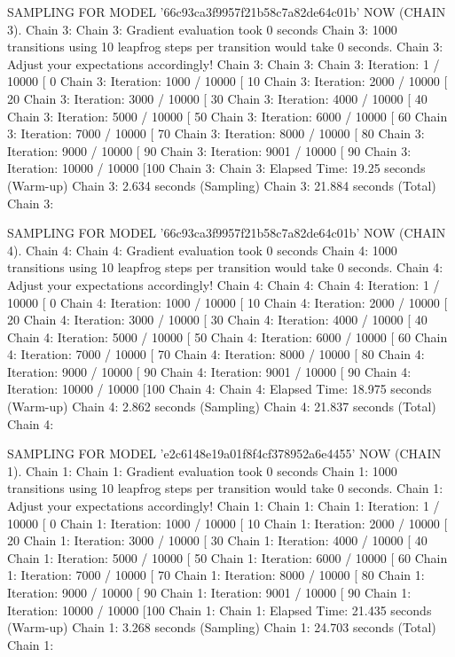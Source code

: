 \documentclass[
]{jss}
\begin{document}
\begin{CodeChunk}
\begin{CodeOutput}
SAMPLING FOR MODEL '66c93ca3f9957f21b58c7a82de64c01b' NOW (CHAIN 3).
Chain 3: 
Chain 3: Gradient evaluation took 0 seconds
Chain 3: 1000 transitions using 10 leapfrog steps per transition would take 0 seconds.
Chain 3: Adjust your expectations accordingly!
Chain 3: 
Chain 3: 
Chain 3: Iteration:    1 / 10000 [  0%
Chain 3: Iteration: 1000 / 10000 [ 10%
Chain 3: Iteration: 2000 / 10000 [ 20%
Chain 3: Iteration: 3000 / 10000 [ 30%
Chain 3: Iteration: 4000 / 10000 [ 40%
Chain 3: Iteration: 5000 / 10000 [ 50%
Chain 3: Iteration: 6000 / 10000 [ 60%
Chain 3: Iteration: 7000 / 10000 [ 70%
Chain 3: Iteration: 8000 / 10000 [ 80%
Chain 3: Iteration: 9000 / 10000 [ 90%
Chain 3: Iteration: 9001 / 10000 [ 90%
Chain 3: Iteration: 10000 / 10000 [100%
Chain 3: 
Chain 3:  Elapsed Time: 19.25 seconds (Warm-up)
Chain 3:                2.634 seconds (Sampling)
Chain 3:                21.884 seconds (Total)
Chain 3: 

SAMPLING FOR MODEL '66c93ca3f9957f21b58c7a82de64c01b' NOW (CHAIN 4).
Chain 4: 
Chain 4: Gradient evaluation took 0 seconds
Chain 4: 1000 transitions using 10 leapfrog steps per transition would take 0 seconds.
Chain 4: Adjust your expectations accordingly!
Chain 4: 
Chain 4: 
Chain 4: Iteration:    1 / 10000 [  0%
Chain 4: Iteration: 1000 / 10000 [ 10%
Chain 4: Iteration: 2000 / 10000 [ 20%
Chain 4: Iteration: 3000 / 10000 [ 30%
Chain 4: Iteration: 4000 / 10000 [ 40%
Chain 4: Iteration: 5000 / 10000 [ 50%
Chain 4: Iteration: 6000 / 10000 [ 60%
Chain 4: Iteration: 7000 / 10000 [ 70%
Chain 4: Iteration: 8000 / 10000 [ 80%
Chain 4: Iteration: 9000 / 10000 [ 90%
Chain 4: Iteration: 9001 / 10000 [ 90%
Chain 4: Iteration: 10000 / 10000 [100%
Chain 4: 
Chain 4:  Elapsed Time: 18.975 seconds (Warm-up)
Chain 4:                2.862 seconds (Sampling)
Chain 4:                21.837 seconds (Total)
Chain 4: 

SAMPLING FOR MODEL 'e2c6148e19a01f8f4cf378952a6e4455' NOW (CHAIN 1).
Chain 1: 
Chain 1: Gradient evaluation took 0 seconds
Chain 1: 1000 transitions using 10 leapfrog steps per transition would take 0 seconds.
Chain 1: Adjust your expectations accordingly!
Chain 1: 
Chain 1: 
Chain 1: Iteration:    1 / 10000 [  0%
Chain 1: Iteration: 1000 / 10000 [ 10%
Chain 1: Iteration: 2000 / 10000 [ 20%
Chain 1: Iteration: 3000 / 10000 [ 30%
Chain 1: Iteration: 4000 / 10000 [ 40%
Chain 1: Iteration: 5000 / 10000 [ 50%
Chain 1: Iteration: 6000 / 10000 [ 60%
Chain 1: Iteration: 7000 / 10000 [ 70%
Chain 1: Iteration: 8000 / 10000 [ 80%
Chain 1: Iteration: 9000 / 10000 [ 90%
Chain 1: Iteration: 9001 / 10000 [ 90%
Chain 1: Iteration: 10000 / 10000 [100%
Chain 1: 
Chain 1:  Elapsed Time: 21.435 seconds (Warm-up)
Chain 1:                3.268 seconds (Sampling)
Chain 1:                24.703 seconds (Total)
Chain 1: 


\end{CodeOutput}
\end{CodeChunk}
\end{document}
